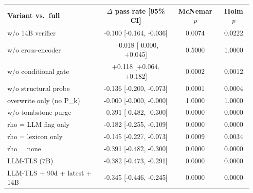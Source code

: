 \begin{tabular}{@{}lccc@{}}
\toprule
\textbf{Variant vs.\ full} & $\Delta$ pass rate [95\% CI] & McNemar $p$ & Holm $p$ \\
\midrule
w/o 14B verifier & -0.100 [-0.164, -0.036] & 0.0074 & 0.0222 \\
w/o cross-encoder & +0.018 [-0.000, +0.045] & 0.5000 & 1.0000 \\
w/o conditional gate & +0.118 [+0.064, +0.182] & 0.0002 & 0.0012 \\
w/o structural probe & -0.136 [-0.200, -0.073] & 0.0001 & 0.0004 \\
overwrite only (no P\_k) & -0.000 [-0.000, -0.000] & 1.0000 & 1.0000 \\
w/o tombstone purge & -0.391 [-0.482, -0.300] & 0.0000 & 0.0000 \\
rho = LLM flag only & -0.182 [-0.255, -0.109] & 0.0000 & 0.0000 \\
rho = lexicon only & -0.145 [-0.227, -0.073] & 0.0009 & 0.0034 \\
rho = none & -0.391 [-0.482, -0.300] & 0.0000 & 0.0000 \\
LLM-TLS (7B) & -0.382 [-0.473, -0.291] & 0.0000 & 0.0000 \\
LLM-TLS + 90d + latest + 14B & -0.345 [-0.446, -0.245] & 0.0000 & 0.0000 \\
\bottomrule
\end{tabular}
